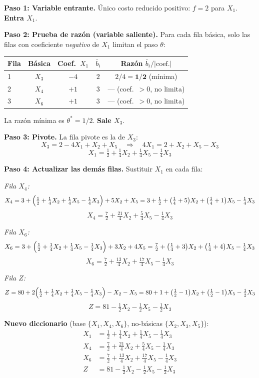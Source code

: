 \documentclass{article}
\begin{document}
\begin{enumerate}[a)]
\textbf{Paso 1: Variable entrante.} Único costo reducido positivo: $f=2$ para $X_1$. \textbf{Entra $X_1$}.

\textbf{Paso 2: Prueba de razón (variable saliente).} Para cada fila básica, solo las filas con coeficiente \emph{negativo} de $X_1$ limitan el paso $\theta$:

\begin{center}
\renewcommand{\arraystretch}{1.4}
\begin{tabular}{lcccc}
\hline
Fila & Básica & Coef.\ $X_1$ & $\bar{b}_i$ & Razón $\bar{b}_i/|\text{coef.}|$ \\
\hline
1 & $X_3$ & $-4$ & $2$ & $2/4=\mathbf{1/2}$ (mínima) \\
2 & $X_4$ & $+1$ & $3$ & --- (coef.\ $>0$, no limita) \\
3 & $X_6$ & $+1$ & $3$ & --- (coef.\ $>0$, no limita) \\
\hline
\end{tabular}
\end{center}

La razón mínima es $\theta^*=1/2$. \textbf{Sale $X_3$}.

\textbf{Paso 3: Pivote.} La fila pivote es la de $X_3$:
$$X_3 = 2 - 4X_1 + X_2 + X_5 \quad\Longrightarrow\quad 4X_1 = 2 + X_2 + X_5 - X_3$$
$$\boxed{X_1 = \tfrac{1}{2} + \tfrac{1}{4}X_2 + \tfrac{1}{4}X_5 - \tfrac{1}{4}X_3}$$

\textbf{Paso 4: Actualizar las demás filas.} Sustituir $X_1$ en cada fila:

\textit{Fila $X_4$:}
$$X_4 = 3 + \Bigl(\tfrac{1}{2}+\tfrac{1}{4}X_2+\tfrac{1}{4}X_5-\tfrac{1}{4}X_3\Bigr) + 5X_2 + X_5
= 3+\tfrac{1}{2} + \bigl(\tfrac{1}{4}+5\bigr)X_2 + \bigl(\tfrac{1}{4}+1\bigr)X_5 - \tfrac{1}{4}X_3$$
$$\boxed{X_4 = \tfrac{7}{2} + \tfrac{21}{4}X_2 + \tfrac{5}{4}X_5 - \tfrac{1}{4}X_3}$$

\textit{Fila $X_6$:}
$$X_6 = 3 + \Bigl(\tfrac{1}{2}+\tfrac{1}{4}X_2+\tfrac{1}{4}X_5-\tfrac{1}{4}X_3\Bigr) + 3X_2 + 4X_5
= \tfrac{7}{2} + \bigl(\tfrac{1}{4}+3\bigr)X_2 + \bigl(\tfrac{1}{4}+4\bigr)X_5 - \tfrac{1}{4}X_3$$
$$\boxed{X_6 = \tfrac{7}{2} + \tfrac{13}{4}X_2 + \tfrac{17}{4}X_5 - \tfrac{1}{4}X_3}$$

\textit{Fila $Z$:}
$$Z = 80 + 2\Bigl(\tfrac{1}{2}+\tfrac{1}{4}X_2+\tfrac{1}{4}X_5-\tfrac{1}{4}X_3\Bigr) - X_2 - X_5
= 80+1 + \bigl(\tfrac{1}{2}-1\bigr)X_2 + \bigl(\tfrac{1}{2}-1\bigr)X_5 - \tfrac{1}{2}X_3$$
$$\boxed{Z = 81 - \tfrac{1}{2}X_2 - \tfrac{1}{2}X_5 - \tfrac{1}{2}X_3}$$

\textbf{Nuevo diccionario} (base $\{X_1,X_4,X_6\}$, no-básicas $\{X_2,X_3,X_5\}$):
$$\begin{aligned}
X_1 &= \tfrac{1}{2} + \tfrac{1}{4}X_2 + \tfrac{1}{4}X_5 - \tfrac{1}{4}X_3 \\
X_4 &= \tfrac{7}{2} + \tfrac{21}{4}X_2 + \tfrac{5}{4}X_5 - \tfrac{1}{4}X_3 \\
X_6 &= \tfrac{7}{2} + \tfrac{13}{4}X_2 + \tfrac{17}{4}X_5 - \tfrac{1}{4}X_3 \\
Z   &= 81 - \tfrac{1}{2}X_2 - \tfrac{1}{2}X_5 - \tfrac{1}{2}X_3
\end{aligned}$$


\end{enumerate}
\end{document}
